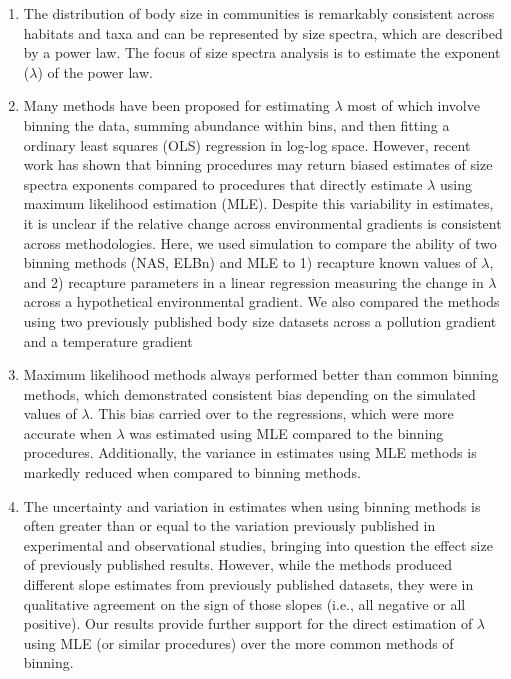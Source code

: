 \documentclass[
]{article}
\providecommand{\tightlist}{%
  \setlength{\itemsep}{0pt}\setlength{\parskip}{0pt}}
\begin{document}
\begin{enumerate}
\def\labelenumi{\arabic{enumi}.}
\tightlist
\item
  The distribution of body size in communities is remarkably consistent
  across habitats and taxa and can be represented by size spectra, which
  are described by a power law. The focus of size spectra analysis is to
  estimate the exponent (\(\lambda\)) of the power law.
\item
  Many methods have been proposed for estimating \(\lambda\) most of
  which involve binning the data, summing abundance within bins, and
  then fitting a ordinary least squares (OLS) regression in log-log
  space. However, recent work has shown that binning procedures may
  return biased estimates of size spectra exponents compared to
  procedures that directly estimate \(\lambda\) using maximum likelihood
  estimation (MLE). Despite this variability in estimates, it is unclear
  if the relative change across environmental gradients is consistent
  across methodologies. Here, we used simulation to compare the ability
  of two binning methods (NAS, ELBn) and MLE to 1) recapture known
  values of \(\lambda\), and 2) recapture parameters in a linear
  regression measuring the change in \(\lambda\) across a hypothetical
  environmental gradient. We also compared the methods using two
  previously published body size datasets across a pollution gradient
  and a temperature gradient
\item
  Maximum likelihood methods always performed better than common binning
  methods, which demonstrated consistent bias depending on the simulated
  values of \(\lambda\). This bias carried over to the regressions,
  which were more accurate when \(\lambda\) was estimated using MLE
  compared to the binning procedures. Additionally, the variance in
  estimates using MLE methods is markedly reduced when compared to
  binning methods.
\item
  The uncertainty and variation in estimates when using binning methods
  is often greater than or equal to the variation previously published
  in experimental and observational studies, bringing into question the
  effect size of previously published results. However, while the
  methods produced different slope estimates from previously published
  datasets, they were in qualitative agreement on the sign of those
  slopes (i.e., all negative or all positive). Our results provide
  further support for the direct estimation of \(\lambda\) using MLE (or
  similar procedures) over the more common methods of binning.
\end{enumerate}
\end{document}
